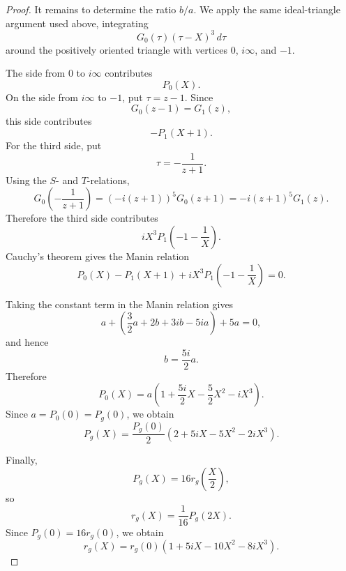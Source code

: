 \documentclass[10pt,a4paper]{amsart}
\begin{document}
\begin{proof}
	It remains to determine the ratio $b/a$.  We apply the same ideal-triangle argument used above, integrating
	\[
	G_0(\tau)(\tau-X)^3\,d\tau
	\]
	around the positively oriented triangle with vertices $0$, $i\infty$, and $-1$.
	
	The side from $0$ to $i\infty$ contributes
	\[
	P_0(X).
	\]
	On the side from $i\infty$ to $-1$, put $\tau=z-1$.  Since
	\[
	G_0(z-1)=G_1(z),
	\]
	this side contributes
	\[
	-P_1(X+1).
	\]
	For the third side, put
	\[
	\tau=-\frac{1}{z+1}.
	\]
	Using the $S$- and $T$-relations,
	\[
	G_0\left(-\frac{1}{z+1}\right)
	=
	(-i(z+1))^5G_0(z+1)
	=
	-i(z+1)^5G_1(z).
	\]
	Therefore the third side contributes
	\[
	iX^3P_1\left(-1-\frac{1}{X}\right).
	\]
	Cauchy's theorem gives the Manin relation
	\[
	P_0(X)-P_1(X+1)
	+iX^3P_1\left(-1-\frac{1}{X}\right)=0.
	\]
	
Taking the constant term in the Manin relation gives
\[
a+\left(\frac{3}{2}a+2b+3ib-5ia\right)+5a=0,
\]
and hence
\[
b=\frac{5i}{2}a.
\]
Therefore
\[
P_0(X)=a\left(1+\frac{5i}{2}X-\frac{5}{2}X^2-iX^3\right).
\]
Since $a=P_0(0)=P_g(0)$, we obtain
\[
P_g(X)=\frac{P_g(0)}{2}\left(2+5iX-5X^2-2iX^3\right).
\]
	
	Finally,
	\[
	P_g(X)=16r_g\left(\frac{X}{2}\right),
	\]
	so
	\[
	r_g(X)=\frac{1}{16}P_g(2X).
	\]
	Since $P_g(0)=16r_g(0)$, we obtain
	\[
	r_g(X)
	=
	r_g(0)\left(1+5iX-10X^2-8iX^3\right).
	\]
\end{proof}
\end{document}

